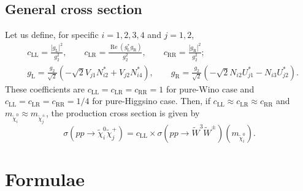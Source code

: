 \documentclass[a4paper,10pt,captions=tableheading,DIV=14]{scrartcl}
\numberwithin{equation}{section}
\newcommand\w[1]{_{\mathrm{#1}}}
\renewcommand{\Re}{\mathop{\mathrm{Re}}}
\newcommand\neut  [1][\relax]{{\tilde\chi^0_{#1}}}
\newcommand\charP [1][\relax]{{\tilde\chi^+_{#1}}}
\newcommand\charPM[1][\relax]{{\tilde\chi^\pm_{#1}}}
\newcommand{\gL}{g\w L}
\newcommand{\gR}{g\w R}
\begin{document}
\subsection{General cross section}
Let us define, for specific $i=1,2,3,4$ and $j=1,2$,
\begin{align}
 &c\w{LL} = \frac{|\gL|^2}{g_2^2},
\qquad
  c\w{LR} = \frac{\Re(\gL^*\gR)}{g_2^2},
\qquad
  c\w{RR} = \frac{|\gR|^2}{g_2^2};
\\
 &
 \gL = \frac{g_2}{\sqrt2}\left(-{\sqrt2}V_{j1}N_{i2}^* + V_{j2}N^*_{i4}\right),\qquad
 \gR = \frac{g_2}{\sqrt2}\left(-{\sqrt2}N_{i2}U_{j1}^* - N_{i3}U_{j2}^*\right).
\end{align}
These coefficients are $c\w{LL}=c\w{LR}=c\w{RR}=1$ for pure-Wino case and $c\w{LL}=c\w{LR}=c\w{RR}=1/4$ for pure-Higgsino case.
Then, if $c\w{LL}\approx c\w{LR}\approx c\w{RR}$ and $m_{\neut[i]}\approx m_{\charPM[j]}$, the production cross section is given by
\begin{equation}
 \sigma(pp\to\neut[i]\charP[j]) = c\w{LL}\times\sigma(pp\to\tilde W^3\tilde W^\pm)(m_{\neut[i]}).
\end{equation}


\clearpage
\appendix
\section{Formulae}
\end{document}
